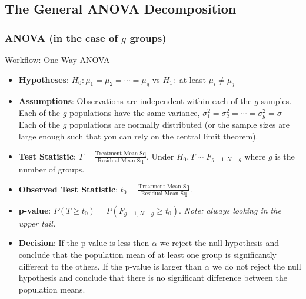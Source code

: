 \documentclass[a4paper]{article}
\begin{document}
\subsection{The General ANOVA Decomposition}
\subsubsection{ANOVA (in the case of \( g \) groups)}
\begin{redbox}{Workflow: One-Way ANOVA}
	\begin{itemize}
		\item \textbf{Hypotheses}: \( H_0: \mu_1 = \mu_2 = \dotsb = \mu_g \) vs \( H_1: \) at least \( \mu_i \neq \mu_j \)
		\item \textbf{Assumptions}: Observations are independent within each of the \( g \) samples. Each of the \( g \) populations have the same variance, \( \sigma^2_1 = \sigma_2^2 = \dotsb = \sigma_g^2 = \sigma \) Each of the \( g \) populations are normally distributed (or the sample sizes are large enough such that you can rely on the central limit theorem).
		\item \textbf{Test Statistic}: \( T = \frac{\text{Treatment Mean Sq}}{\text{Residual Mean Sq}} \). Under \( H_0, T \sim F_{g-1,N-g} \) where \( g \) is the number of groups.
		\item \textbf{Observed Test Statistic}: \( t_0 = \frac{\text{Treatment Mean Sq}}{\text{Residual Mean Sq}} \).
		\item \textbf{p-value}: \( P (T \geq t_0) = P(F_{g-1,N-g} \geq t_0) \). \textit{Note: always looking in the upper tail.}
		\item \textbf{Decision}: If the p-value is less then \( \alpha \) we reject the null hypothesis and conclude that the population mean of at least one group is significantly different to the others. If the p-value is larger than \( \alpha \) we do not reject the null hypothesis and conclude that there is no significant difference between the population means.
	\end{itemize}
\end{redbox}
\end{document}
